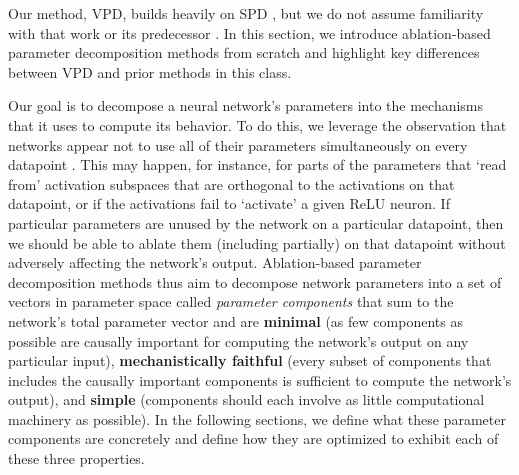 \documentclass{article}
\begin{document}
Our method, VPD, builds heavily on SPD \cite{bushnaq2025spd}, but we do not assume familiarity with that work or its predecessor \cite{braun2025interpretabilityparameterspaceminimizing}. In this section, we introduce ablation-based parameter decomposition methods from scratch and highlight key differences between VPD and prior methods in this class.

Our goal is to decompose a neural network's parameters into the mechanisms that it uses to compute its behavior. To do this, we leverage the observation that networks appear not to use all of their parameters simultaneously on every datapoint \cite{veit2016residual, zhang2022moefication, dong2023attention}. This may happen, for instance, for parts of the parameters that `read from' activation subspaces that are orthogonal to the activations on that datapoint, or if the activations fail to `activate' a given ReLU neuron. If particular parameters are unused by the network on a particular datapoint, then we should be able to ablate them (including partially) on that datapoint without adversely affecting the network's output. Ablation-based parameter decomposition methods thus aim to decompose network parameters into a set of vectors in parameter space called \textit{parameter components} that sum to the network's total parameter vector and are \textbf{minimal} (as few components as possible are causally important for computing the network's output on any particular input), \textbf{mechanistically faithful} (every subset of components that includes the causally important components is sufficient to compute the network's output), and \textbf{simple} (components should each involve as little computational machinery as possible). In the following sections, we define what these parameter components are concretely and define how they are optimized to exhibit each of these three properties. 
\end{document}
